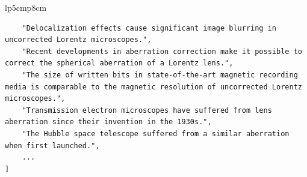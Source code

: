 \documentclass[11pt]{article}
\begin{document}
\begin{table}[h]
\begin{tabular}{lp{5cm}p{8cm}}
\begin{minipage}{\linewidth}
\begin{lstlisting}
    "Delocalization effects cause significant image blurring in uncorrected Lorentz microscopes.",
    "Recent developments in aberration correction make it possible to correct the spherical aberration of a Lorentz lens.",
    "The size of written bits in state-of-the-art magnetic recording media is comparable to the magnetic resolution of uncorrected Lorentz microscopes.",
    "Transmission electron microscopes have suffered from lens aberration since their invention in the 1930s.",
    "The Hubble space telescope suffered from a similar aberration when first launched.",
    ...
]
\end{lstlisting}
\end{minipage} \\
    \bottomrule
    \end{tabular}
    \caption{A sample of extracted claims from the \DatasetNameMatSci~dataset. Award IDs are hyperlinked to the NSF's Award database.}
    \label{tab:claim-examples}
\end{table}
\end{document}
